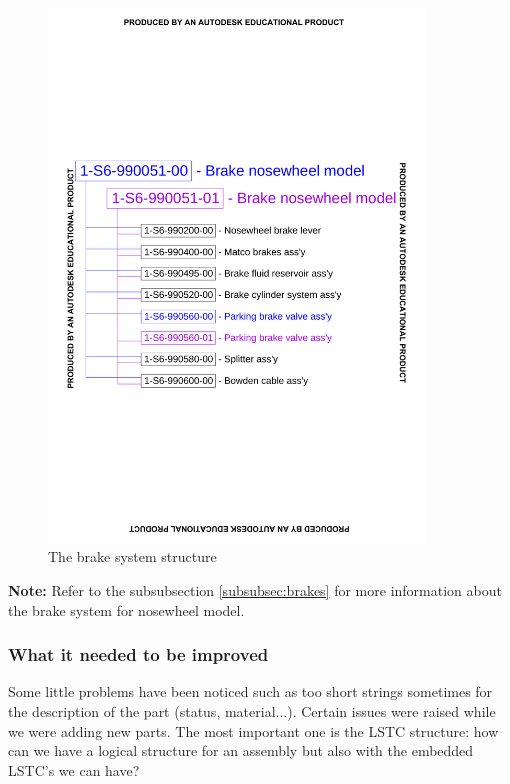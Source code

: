 \documentclass[11pt,a4paper]{article}
\begin{document}
\begin{figure}[ht!]
	\begin{center}
		\includegraphics[width=10cm,trim = 1.5cm 8.5cm 1.5cm 8.5cm, clip]{pics/PIC025.pdf}
		\caption{The brake system structure}
		\label{fig:PIC025}
	\end{center}
\end{figure}

\bigskip

\textbf{Note:} Refer to the subsubsection \ref{subsubsec:brakes} for more information about the brake system for nosewheel model.

\newpage

\subsubsection{What it needed to be improved}
Some little problems have been noticed such as too short strings sometimes for the description of the part (status, material...).
Certain issues were raised while we were adding new parts. The most important one is the LSTC structure: how can we have a logical structure for an assembly but also with the embedded LSTC's we can have? %
\end{document}
